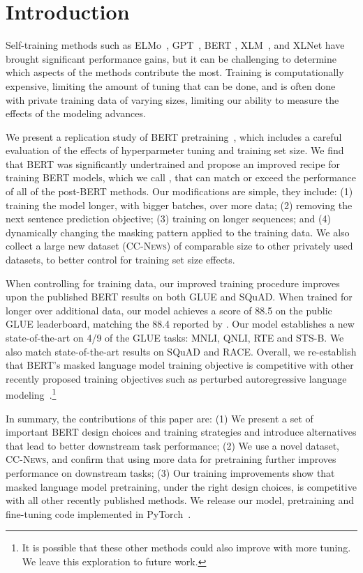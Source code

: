\section{Introduction}
\label{intro}

Self-training methods such as ELMo~\cite{peters2018deep}, GPT~\cite{radford2018gpt}, BERT \cite{devlin2018bert}, XLM~\cite{lample2019cross}, and XLNet \cite{yang2019xlnet} have brought significant performance gains, but it can be challenging to determine which aspects of the methods contribute the most. %
Training is computationally expensive, limiting the amount of tuning that can be done, and is often done with private training data of varying sizes, limiting our ability to measure the effects of the modeling advances. 


We present a replication study of BERT pretraining~\cite{devlin2018bert}, which includes a careful evaluation of the effects of hyperparmeter tuning and training set size. %
We find that BERT was significantly undertrained and propose an improved recipe for training BERT models, which we call \ourmodel{}, that can match or exceed the performance of all of the post-BERT methods.
Our modifications are simple, they include: (1) training the model longer, with bigger batches, over more data; (2) removing the next sentence prediction objective; (3) training on longer sequences; and (4) dynamically changing the masking pattern applied to the training data. We also collect a large new dataset (\textsc{CC-News}) of comparable size to other privately used datasets, to better control for training set size effects. 

When controlling for training data, our improved training procedure improves upon the published BERT results on both GLUE and SQuAD.
When trained for longer over additional data, our model achieves a score of 88.5 on the public GLUE leaderboard, matching the 88.4 reported by .
Our model establishes a new state-of-the-art on 4/9 of the GLUE tasks: MNLI, QNLI, RTE and STS-B.
We also match state-of-the-art results on SQuAD and RACE.
Overall, we re-establish that BERT's masked language model training objective is competitive with other recently proposed training objectives such as perturbed autoregressive language modeling~\cite{yang2019xlnet}.\footnote{It is possible that these other methods could also improve with more tuning. We leave this exploration to future work.}

In summary, the contributions of this paper are: (1) We present a set of important BERT design choices and training strategies and introduce alternatives that lead to better downstream task performance; (2) We use a novel dataset, \textsc{CC-News}, and confirm that using more data for pretraining further improves performance on downstream tasks; (3) Our training improvements show that masked language model pretraining, under the right design choices, is competitive with all other recently published methods. We release our model, pretraining and fine-tuning code implemented in PyTorch~\cite{paszke2017automatic}.